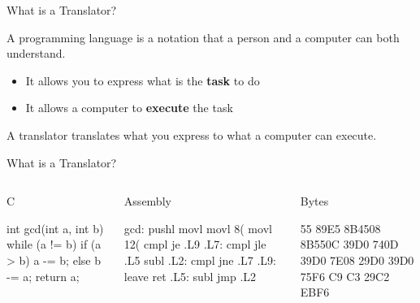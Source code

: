 \documentclass{plt}
\begin{document}
\begin{frame}[fragile]{What is a Translator?}

A programming language is a notation that  a person and a computer can both understand.
\begin{itemize}

\item It allows you to express what is the \textbf{task} to do

\item It allows a computer to \textbf{execute} the task

\end{itemize}


\alert{A translator translates what you express to what a computer can execute.}

\end{frame}

\begin{frame}[fragile]{What is a Translator?}


  \begin{columns}

    \begin{column}[t]{0.35\textwidth}

      \alert{C}

      \medskip  
  \begin{C}
int gcd(int a, int b)
{
  while (a != b) {
    if (a > b) 
        a -= b;
    else b -= a;
  }
  return a;
}
\end{C}
    \end{column}

    \begin{column}[t]{0.36\textwidth}

      \alert{Assembly}

      \medskip

\begin{shadedverbatim}
gcd: pushl %
     movl  %
     movl  8(%
     movl  12(%
     cmpl  %
     je    .L9
.L7: cmpl  %
     jle   .L5
     subl  %
.L2: cmpl  %
     jne   .L7
.L9: leave
     ret
.L5: subl  %
     jmp   .L2
\end{shadedverbatim}

    \end{column}

    \begin{column}[t]{0.13\textwidth}

      \alert{Bytes}

      \medskip

\begin{shadedverbatim}
55    
89E5  
8B4508
8B550C
39D0  
740D
39D0  
7E08  
29D0  
39D0  
75F6  
C9    
C3    
29C2  
EBF6
\end{shadedverbatim}   
    
    \end{column}
    
  \end{columns}

\end{frame}
\end{document}
